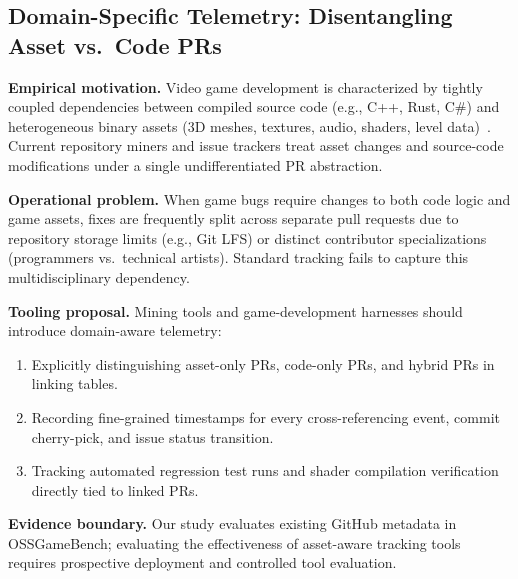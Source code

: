 \subsection{Domain-Specific Telemetry: Disentangling Asset vs.\ Code PRs}
\textbf{Empirical motivation.} Video game development is characterized by tightly coupled dependencies between compiled source code (e.g., C++, Rust, C\#) and heterogeneous binary assets (3D meshes, textures, audio, shaders, level data)~\cite{marsad2026ossgamebench}. Current repository miners and issue trackers treat asset changes and source-code modifications under a single undifferentiated PR abstraction.

\textbf{Operational problem.} When game bugs require changes to both code logic and game assets, fixes are frequently split across separate pull requests due to repository storage limits (e.g., Git LFS) or distinct contributor specializations (programmers vs.\ technical artists). Standard tracking fails to capture this multidisciplinary dependency.

\textbf{Tooling proposal.} Mining tools and game-development harnesses should introduce domain-aware telemetry:
\begin{enumerate}
    \item Explicitly distinguishing asset-only PRs, code-only PRs, and hybrid PRs in linking tables.
    \item Recording fine-grained timestamps for every cross-referencing event, commit cherry-pick, and issue status transition.
    \item Tracking automated regression test runs and shader compilation verification directly tied to linked PRs.
\end{enumerate}

\textbf{Evidence boundary.} Our study evaluates existing GitHub metadata in OSSGameBench; evaluating the effectiveness of asset-aware tracking tools requires prospective deployment and controlled tool evaluation.
